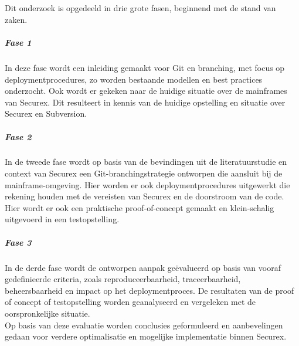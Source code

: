 
\chapter{}%
\label{ch:methodologie}

Dit onderzoek is opgedeeld in drie grote fasen, beginnend met de stand van zaken.

\paragraph{Fase 1}
In deze fase wordt een inleiding gemaakt voor Git en branching, met focus op deploymentprocedures, zo worden bestaande modellen en best practices onderzocht. Ook wordt er gekeken naar de huidige situatie over de mainframes van Securex. Dit resulteert in kennis van de huidige opstelling en situatie over Securex en Subversion.

\paragraph{Fase 2}
In de tweede fase wordt op basis van de bevindingen uit de literatuurstudie en context van Securex een Git-branchingstrategie ontworpen die aansluit bij de mainframe-omgeving. Hier worden er ook deploymentprocedures uitgewerkt die rekening houden met de vereisten van Securex en de doorstroom van de code. Hier wordt er ook een praktische proof-of-concept gemaakt en klein-schalig uitgevoerd in een testopstelling.

\paragraph{Fase 3}
In de derde fase wordt de ontworpen aanpak geëvalueerd op basis van vooraf gedefinieerde criteria, zoals reproduceerbaarheid, traceerbaarheid, beheersbaarheid en impact op het deploymentproces. De resultaten van de proof of concept of testopstelling worden geanalyseerd en vergeleken met de oorspronkelijke situatie.\\

Op basis van deze evaluatie worden conclusies geformuleerd en aanbevelingen gedaan voor verdere optimalisatie en mogelijke implementatie binnen Securex.

